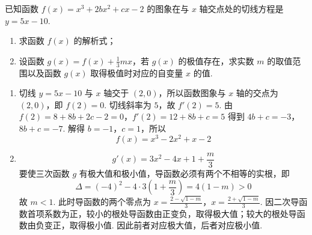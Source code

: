 \begin{problem}
已知函数 \(f(x) = x^3 + 2bx^2 + cx - 2\) 的图象在与 \(x\) 轴交点处的切线方程是 \(y = 5x - 10\).

\begin{enumerate}
\item 求函数 \(f(x)\) 的解析式；
\item 设函数 \(g(x) = f(x) + \frac{1}{3}mx\)，若 \(g(x)\) 的极值存在，求实数 \(m\) 的取值范围以及函数 \(g(x)\) 取得极值时对应的自变量 \(x\) 的值.
\end{enumerate}
\begin{solution}
\begin{enumerate}
\item 切线 \(y=5x-10\) 与 \(x\) 轴交于 \((2,0)\)，所以函数图象与 \(x\) 轴的交点为 \((2,0)\)，即
\(f(2)=0\). 切线斜率为 \(5\)，故 \(f'(2)=5\). 由
\(f(2)=8+8b+2c-2=0\)，\(f'(2)=12+8b+c=5\)
得到
\(4b+c=-3\)，\(8b+c=-7\).
解得 \(b=-1\)，\(c=1\)，所以
\[
f(x)=x^3-2x^2+x-2
\]

\item
\[
g'(x)=3x^2-4x+1+\frac{m}{3}
\]
要使三次函数 \(g\) 有极大值和极小值，导函数必须有两个不相等的实根，即
\[
\Delta=(-4)^2-4\cdot3\left(1+\frac{m}{3}\right)=4(1-m)>0
\]
故 \(m<1\). 此时导函数的两个零点为
\(x=\frac{2-\sqrt{1-m}}{3}\)，\(x=\frac{2+\sqrt{1-m}}{3}\).
因二次导函数首项系数为正，较小的根处导函数由正变负，取得极大值；较大的根处导函数由负变正，取得极小值. 因此前者对应极大值，后者对应极小值.
\end{enumerate}
\end{solution}
\end{problem}

